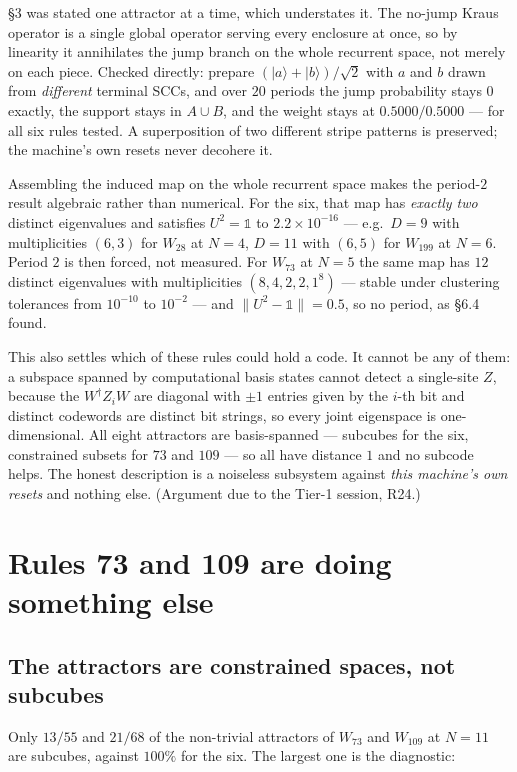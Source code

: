 \documentclass[11pt]{article}
\theoremstyle{plain}
\begin{document}
\S3 was stated one attractor at a time, which understates it. The no-jump Kraus
operator is a single global operator serving every enclosure at once, so by
linearity it annihilates the jump branch on the whole recurrent space, not merely
on each piece. Checked directly: prepare
$(\lvert a\rangle+\lvert b\rangle)/\sqrt2$ with $a$ and $b$ drawn from
\emph{different} terminal SCCs, and over $20$ periods the jump probability stays
$0$ exactly, the support stays in $A\cup B$, and the weight stays at
$0.5000/0.5000$ --- for all six rules tested. A superposition of two different
stripe patterns is preserved; the machine's own resets never decohere it.

Assembling the induced map on the whole recurrent space makes the period-$2$
result algebraic rather than numerical. For the six, that map has \emph{exactly
two} distinct eigenvalues and satisfies $U^2=\mathbb{1}$ to
$2.2\times10^{-16}$ --- e.g.\ $D=9$ with multiplicities $(6,3)$ for $W_{28}$ at
$N=4$, $D=11$ with $(6,5)$ for $W_{199}$ at $N=6$. Period $2$ is then forced, not
measured. For $W_{73}$ at $N=5$ the same map has $12$ distinct eigenvalues with
multiplicities $(8,4,2,2,1^8)$ --- stable under clustering tolerances from
$10^{-10}$ to $10^{-2}$ --- and $\lVert U^2-\mathbb{1}\rVert=0.5$, so no period,
as \S6.4 found.

This also settles which of these rules could hold a code. It cannot be any of
them: a subspace spanned by computational basis states cannot detect a
single-site $Z$, because the $W^\dagger Z_iW$ are diagonal with $\pm1$ entries
given by the $i$-th bit and distinct codewords are distinct bit strings, so every
joint eigenspace is one-dimensional. All eight attractors are basis-spanned ---
subcubes for the six, constrained subsets for $73$ and $109$ --- so all have
distance $1$ and no subcode helps. The honest description is a noiseless
subsystem against \emph{this machine's own resets} and nothing else. (Argument
due to the Tier-1 session, R24.)

\section{Rules 73 and 109 are doing something else}

\subsection{The attractors are constrained spaces, not subcubes}

Only $13/55$ and $21/68$ of the non-trivial attractors of $W_{73}$ and $W_{109}$
at $N=11$ are subcubes, against $100\%$ for the six. The largest one is the
diagnostic:
\end{document}

